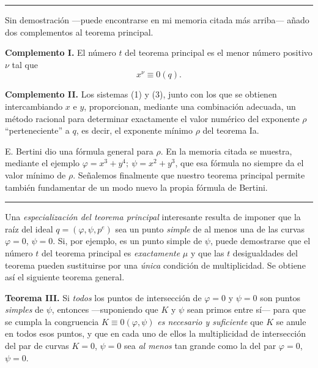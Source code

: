 \begin{center}
\rule{4cm}{0.4pt}
\end{center}

Sin demostración ---puede encontrarse en mi memoria citada más arriba--- añado dos complementos al teorema principal.

\textbf{Complemento I.} El número $t$ del teorema principal es el menor número positivo $\nu$ tal que
\[
x^\nu\equiv0(q).
\]

\textbf{Complemento II.} Los sistemas (1) y (3), junto con los que se obtienen intercambiando $x$ e $y$, proporcionan, mediante una combinación adecuada, un método racional para determinar exactamente el valor numérico del exponente $\rho$ ``perteneciente'' a $q$, es decir, el exponente mínimo $\rho$ del teorema Ia.

E. Bertini dio una fórmula general para $\rho$. En la memoria citada se muestra, mediante el ejemplo $\varphi=x^3+y^4;\ \psi=x^2+y^3$, que esa fórmula no siempre da el valor mínimo de $\rho$. Señalemos finalmente que nuestro teorema principal permite también fundamentar de un modo nuevo la propia fórmula de Bertini.

\begin{center}
\rule{4cm}{0.4pt}
\end{center}

Una \emph{especialización del teorema principal} interesante resulta de imponer que la raíz del ideal $q=(\varphi,\psi,p^e)$ sea un punto \emph{simple} de al menos una de las curvas $\varphi=0$, $\psi=0$. Si, por ejemplo, es un punto simple de $\psi$, puede demostrarse que el número $t$ del teorema principal es \emph{exactamente} $\mu$ y que las $t$ desigualdades del teorema pueden sustituirse por una \emph{única} condición de multiplicidad. Se obtiene así el siguiente teorema general.

\textbf{Teorema III.} Si \emph{todos} los puntos de intersección de $\varphi=0$ y $\psi=0$ son puntos \emph{simples} de $\psi$, entonces ---suponiendo que $K$ y $\psi$ sean primos entre sí--- para que se cumpla la congruencia $K\equiv0(\varphi,\psi)$ \emph{es necesario y suficiente} que $K$ se anule en todos esos puntos, y que en cada uno de ellos la multiplicidad de intersección del par de curvas $K=0$, $\psi=0$ sea \emph{al menos} tan grande como la del par $\varphi=0$, $\psi=0$.


